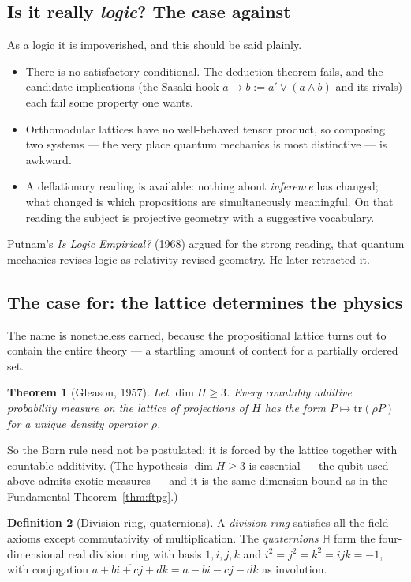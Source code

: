 \documentclass[11pt,a4paper]{article}
\newtheorem{theorem}{Theorem}[section]
\theoremstyle{definition}
\newtheorem{definition}[theorem]{Definition}
\theoremstyle{remark}
\newcommand{\HH}{\mathbb{H}}
\begin{document}
\subsection{Is it really \emph{logic}? The case against}

As a logic it is impoverished, and this should be said plainly.
\begin{itemize}[nosep]
  \item There is no satisfactory conditional. The deduction theorem fails, and the candidate
        implications (the Sasaki hook $a \to b := a' \vee (a \wedge b)$ and its rivals) each
        fail some property one wants.
  \item Orthomodular lattices have no well-behaved tensor product, so composing two systems
        --- the very place quantum mechanics is most distinctive --- is awkward.
  \item A deflationary reading is available: nothing about \emph{inference} has changed; what
        changed is which propositions are simultaneously meaningful. On that reading the
        subject is projective geometry with a suggestive vocabulary.
\end{itemize}
Putnam's \emph{Is Logic Empirical?} (1968) argued for the strong reading, that quantum
mechanics revises logic as relativity revised geometry. He later retracted it.

\subsection{The case for: the lattice determines the physics}

The name is nonetheless earned, because the propositional lattice turns out to contain the
entire theory --- a startling amount of content for a partially ordered set.

\begin{theorem}[Gleason, 1957]
Let $\dim H \geq 3$. Every countably additive probability measure on the lattice of
projections of $H$ has the form $P \mapsto \mathrm{tr}(\rho P)$ for a unique density operator
$\rho$.
\end{theorem}

So the Born rule need not be postulated: it is forced by the lattice together with countable
additivity. (The hypothesis $\dim H \geq 3$ is essential --- the qubit used above admits exotic
measures --- and it is the same dimension bound as in the Fundamental
Theorem~\ref{thm:ftpg}.)

\begin{definition}[Division ring, quaternions]
A \emph{division ring} satisfies all the field axioms except commutativity of multiplication.
The \emph{quaternions} $\HH$ form the four-dimensional real division ring with basis
$1, i, j, k$ and $i^{2} = j^{2} = k^{2} = ijk = -1$, with conjugation
$\overline{a + bi + cj + dk} = a - bi - cj - dk$ as involution.
\end{definition}
\end{document}
